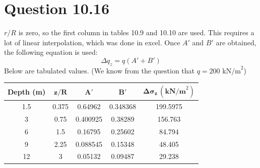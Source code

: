 \documentclass{article}
\begin{document}
\section*{Question 10.16}
$r/R$ is zero, so the first column in tables 10.9 and 10.10 are used. This requires a lot of linear interpolation, which was done in excel. Once $A'$ and $B'$ are obtained, the following equation is used: 
\[\Delta q_z=q(A'+B')\]
Below are tabulated values. (We know from the question that $q=200\text{ kN/m}^2$)
\begin{center}
\begin{tabular}{|ccccc|}
    \hline
    \textbf{Depth (m)} & $\bm{z/R}$ & \textbf{$\bm{A'}$} & \textbf{$\bm{B'}$} & \textbf{$\bm{\Delta\sigma_z}\,(\textbf{kN/m}^2)$}  \\\hline
    1.5 & 0.375                   & 0.64962                & 0.348368               & 199.5975               \\
    3 & 0.75                    & 0.400925               & 0.38289                & 156.763                \\
    6 & 1.5                     & 0.16795                & 0.25602                & 84.794                 \\
    9 & 2.25                    & 0.088545               & 0.15348                & 48.405                 \\
    12 & 3                       & 0.05132                & 0.09487                & 29.238                \\\hline
\end{tabular}
\end{center}
\end{document}
